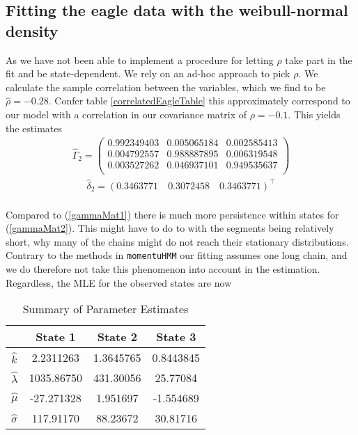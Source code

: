 \subsection{Fitting the eagle data with the weibull-normal density}
As we have not been able to implement a procedure for letting $\rho$ take part in the fit and be state-dependent. We rely on an ad-hoc approach to pick $\rho$. We calculate the sample correlation between the variables, which we find to be $\hat{\rho} = -0.28$. Confer table \ref{correlatedEagleTable} this approximately correspond to our model with a correlation in our covariance matrix of $\rho = -0.1$. This yields the estimates 
\begin{align}
\hat{\Gamma}_2 = 
\begin{pmatrix}
0.992349403 & 0.005065184 & 0.002585413 \\
0.004792557 & 0.988887895 & 0.006319548 \\
0.003527262 & 0.046937101 & 0.949535637 \\
\end{pmatrix}\label{gammaMat2}
\end{align}
\begin{align}
  \hat{\delta}_2 = 
  \left(0.3463771 \quad 0.3072458 \quad 0.3463771 \right)^\top
\end{align}\\
Compared to (\ref{gammaMat1}) there is much more persistence within states for (\ref{gammaMat2}). This might have to do to with the segments being relatively short, why many of the chains might do not reach their stationary distributions. Contrary to the methods in \texttt{momentuHMM} our fitting assumes one long chain, and we do therefore not take this phenomenon into account in the estimation. Regardless, the MLE for the observed states are now
\begin{table}[ht]
  \centering
  \begin{tabular}{lccc}
   & \textbf{State 1} & \textbf{State 2} & \textbf{State 3} \\
  \hline
   $\hat{k}$ & 2.2311263 & 1.3645765 & 0.8443845 \\
   $\hat{\lambda}$ & 1035.86750 & 431.30056 & 25.77084 \\
   $\hat{\mu}$ & -27.271328 & 1.951697 & -1.554689 \\
   $\hat{\sigma}$ & 117.91170 & 88.23672 & 30.81716 \\
  \end{tabular}
  \caption{Summary of Parameter Estimates}
  \label{ParameterEstimatesNew}
\end{table}\\
